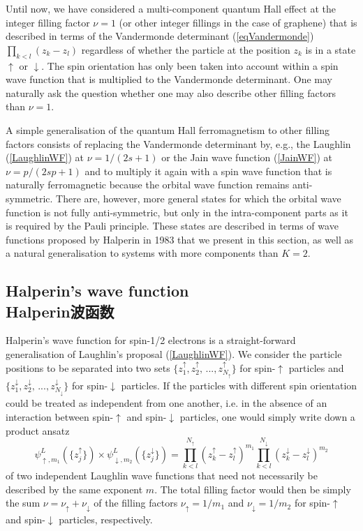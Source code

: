 \documentclass[10pt]{book}
\newcommand{\ua}{\uparrow}
\newcommand{\da}{\downarrow}
\newcommand{\beq}{\begin{equation}}
\newcommand{\eeq}{\end{equation}}
\begin{document}


Until now, we have considered a multi-component quantum Hall effect at the integer filling factor $\nu=1$ (or other integer
fillings in the case of graphene) that is described in terms of the Vandermonde determinant (\ref{eqVandermonde}) 
$\prod_{k<l}(z_k - z_l)$ regardless of whether the particle at the position $z_k$ is in a state $\ua$ or $\da$. The
spin orientation has only been taken into account within a spin wave function that is multiplied to the Vandermonde 
determinant. One may naturally ask the question whether one may also describe other filling factors than $\nu=1$. 

A simple generalisation of the quantum Hall ferromagnetism to other filling factors consists of replacing the
Vandermonde determinant by, e.g., the Laughlin (\ref{LaughlinWF}) at $\nu=1/(2s+1)$ or the Jain wave function (\ref{JainWF})
at $\nu=p/(2sp+1)$ and to multiply it again with a spin wave function that is naturally ferromagnetic because the 
orbital wave function remains anti-symmetric. There are, however, more general states for which the orbital wave function
is not fully anti-symmetric, but only in the intra-component parts as it is required by the Pauli principle. These
states are described in terms of wave functions proposed by Halperin in 1983 \cite{halperin83} that we present in 
this section, as well as a natural generalisation to systems with more components than $K=2$.

\subsection[Halperin波函数]{Halperin's wave function\\\bf Halperin波函数}

Halperin's wave function for spin-1/2 electrons
is a straight-forward generalisation of Laughlin's proposal (\ref{LaughlinWF}). We consider
the particle positions to be separated into two sets $\{z_1^{\ua},z_2^{\ua},\, ..., z_{N_{\ua}}^{\ua}\}$ for 
spin-$\ua$ particles and $\{z_1^{\da},z_2^{\da},\, ..., z_{N_{\da}}^{\da}\}$ for 
spin-$\da$ particles. If the particles with different spin orientation could be treated as independent from one another,
i.e. in the absence of an interaction between spin-$\ua$ and spin-$\da$ particles, one would simply write down
a product ansatz
\beq\label{LaughProd}
\psi_{\ua,m_1}^{L}(\{z_j^{\ua}\})\times \psi_{\da,m_2}^{L}(\{z_j^{\da}\}) 
= \prod_{k<l}^{N_{\ua}}\left(z_k^{\ua} - z_l^{\ua}\right)^{m_1}
\prod_{k<l}^{N_{\da}}\left(z_k^{\da} - z_l^{\da}\right)^{m_2}
\eeq
of two independent Laughlin wave functions that need not necessarily be described by the same exponent $m$. The total
filling factor would then be simply the sum $\nu=\nu_{\ua}+\nu_{\da}$ of the filling factors $\nu_{\ua}=1/m_1$ and
$\nu_{\da}=1/m_2$ for spin-$\ua$ and spin-$\da$ particles, respectively. 
\end{document}
